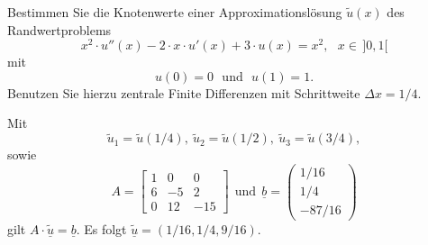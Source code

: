 Bestimmen Sie die Knotenwerte einer Approximationslösung $\tilde u(x)$
des Randwertproblems
\[
x^2 \cdot u''(x) - 2 \cdot x \cdot u'(x) + 3 \cdot u(x) = x^2, \ \ \ x \in\, ]0,1[
\]
mit
\[
u(0) = 0 \ \ \ \text{und} \ \ \ u(1) = 1.
\]
Benutzen Sie hierzu zentrale Finite Differenzen mit Schrittweite $\Delta x = 1/4$. 

\begin{loesung}
Mit 
\[
\tilde u_1 = \tilde u(1/4), \ \tilde u_2 = \tilde u(1/2), \ \tilde u_3 = \tilde u(3/4),
\]
sowie 
\[
A = \left[\begin{array}{rrr} 
1 & 0 & 0 \\
6 & -5 & 2 \\
0 & 12 & -15 \end{array}\right] \ \ \text{und} \ \
\underline{b} =  \left(\begin{array}{c} 1/16 \\ 1/4 \\ -87/16 \end{array}\right)
\]
gilt
$A \cdot \underline{\tilde u} = \underline{b}$.
Es folgt $\underline{\tilde u} = (1/16, 1/4, 9/16)$.
\end{loesung}


